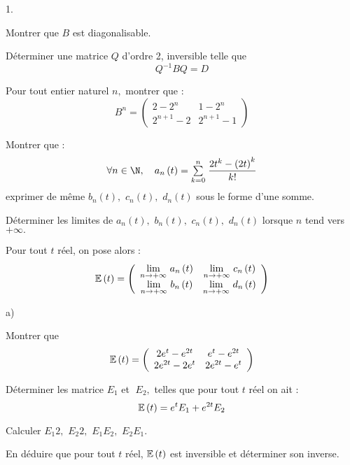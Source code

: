 \documentclass[11pt]{article}%
\begin{document}
\begin{noliste}{1.}
 \setlength{\itemsep}{4mm}
\item Montrer que $B$ est diagonalisable.

\item Déterminer une matrice $Q$ d'ordre 2, inversible telle que 
\[
Q^{-1}BQ = D
\]

\item Pour tout entier naturel $n,$ montrer que : 
\[
B^{n} = \left( 
\begin{array}{cc}
2-2^{n} & 1-2^{n} \\
2^{n + 1}-2 & 2^{n + 1}-1
\end{array}
\right) 
\]

\item Montrer que : 
\[
\forall n\in \N,\quad a_{n}\left( t\right) = \Sum{k =
0}{n}\frac{2t^{k}-\left( 2t\right) ^{k}}{k!}
\]
exprimer de même $b_{n}\left( t\right),$ $c_{n}\left( t\right),$
$d_{n}\left( t\right) $ sous le forme d'une somme.

\item Déterminer les limites de $a_{n}\left( t\right),$ $b_{n}\left(
t\right),$ $c_{n}\left( t\right),$ $d_{n}\left( t\right) $ lorsque $n$
tend vers $ + \infty.$

\item Pour tout $t$ réel, on pose alors : 
\[
\mathbb{E}\left( t\right) = \left( 
\begin{array}{cc}
{\displaystyle \lim_{n\rightarrow + \infty } \ }a_{n}\left( t\right) & 
{\displaystyle \lim_{n\rightarrow + \infty } \ }c_{n}\left( t\right) \\
{\displaystyle \lim_{n\rightarrow + \infty } \ }b_{n}\left( t\right) & 
{\displaystyle \lim_{n\rightarrow + \infty } \ }d_{n}\left( t\right) 
\end{array}
\right) 
\]

\begin{noliste}{a)}
 \setlength{\itemsep}{2mm}
\item Montrer que 
\[
\mathbb{E}\left( t\right) = \left( 
\begin{array}{cc}
2e^{t}-e^{2t} & e^{t}-e^{2t} \\
2e^{2t}-2e^{t} & 2e^{2t}-e^{t}
\end{array}
\right) 
\]

\item Déterminer les matrice $E_{1}$ et $\;E_{2},$ telles que pour tout
$t$ réel on ait : 
\[
\mathbb{E}\left( t\right) = e^{t}E_{1} + e^{2t}E_{2}
\]

\item Calculer $E_{1}{2},$ $E_{2}{2},$ $E_{1}E_{2},$ $E_{2}E_{1}.$

\item En déduire que pour tout $t$ réel, $\mathbb{E}\left( t\right) $ est
inversible
et déterminer son inverse.
\end{noliste}
\end{noliste}
\end{document}
